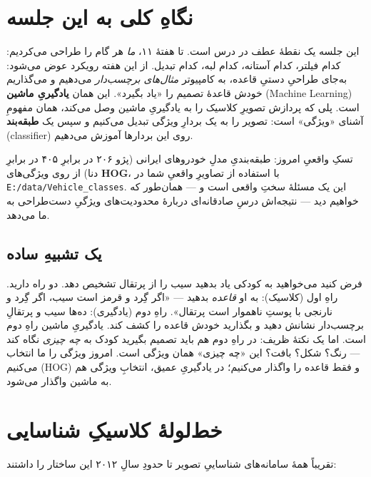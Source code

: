 \documentclass[12pt,a4paper]{article}
\begin{document}

\section*{نگاهِ کلی به این جلسه}

این جلسه یک نقطهٔ عطف در درس است. تا هفتهٔ ۱۱، \emph{ما} هر گام را طراحی می‌کردیم: کدام فیلتر، کدام آستانه، کدام لبه، کدام تبدیل. از این هفته رویکرد عوض می‌شود: به‌جای طراحیِ دستیِ قاعده، به کامپیوتر \emph{مثال‌های برچسب‌دار} می‌دهیم و می‌گذاریم خودش قاعدهٔ تصمیم را «یاد بگیرد». این همان \textbf{یادگیریِ ماشین} (Machine Learning) است. پلی که پردازش تصویرِ کلاسیک را به یادگیریِ ماشین وصل می‌کند، همان مفهومِ آشنای «ویژگی» است: تصویر را به یک بردارِ ویژگی تبدیل می‌کنیم و سپس یک \textbf{طبقه‌بند} (classifier) روی این بردارها آموزش می‌دهیم.

\begin{yaddasht}
تسکِ واقعیِ امروز: طبقه‌بندیِ مدلِ خودروهای ایرانی (پژو ۲۰۶ در برابرِ ۴۰۵ در برابرِ دنا) از روی ویژگی‌های \textbf{HOG}، با استفاده از تصاویرِ واقعیِ شما در \texttt{E:/data/Vehicle\_classes}. این یک مسئلهٔ سختِ واقعی است و — همان‌طور که خواهیم دید — نتیجه‌اش درسِ صادقانه‌ای دربارهٔ محدودیت‌های ویژگیِ دست‌طراحی به ما می‌دهد.
\end{yaddasht}

\subsection*{یک تشبیهِ ساده}

فرض کنید می‌خواهید به کودکی یاد بدهید سیب را از پرتقال تشخیص دهد. دو راه دارید. راهِ اول (کلاسیک): به او \emph{قاعده} بدهید — «اگر گِرد و قرمز است سیب، اگر گِرد و نارنجی با پوستِ ناهموار است پرتقال». راهِ دوم (یادگیری): ده‌ها سیب و پرتقالِ برچسب‌دار نشانش دهید و بگذارید خودش قاعده را کشف کند. یادگیریِ ماشین راهِ دوم است. اما یک نکتهٔ ظریف: در راهِ دوم هم باید تصمیم بگیرید کودک به \emph{چه چیزی} نگاه کند — رنگ؟ شکل؟ بافت؟ این «چه چیزی» همان ویژگی است. امروز ویژگی را ما انتخاب می‌کنیم (HOG) و فقط قاعده را واگذار می‌کنیم؛ در یادگیریِ عمیق، انتخابِ ویژگی هم به ماشین واگذار می‌شود.

\section{خط‌لولهٔ کلاسیکِ شناسایی}

تقریباً همهٔ سامانه‌های شناساییِ تصویر تا حدودِ سالِ ۲۰۱۲ این ساختار را داشتند:
\end{document}
